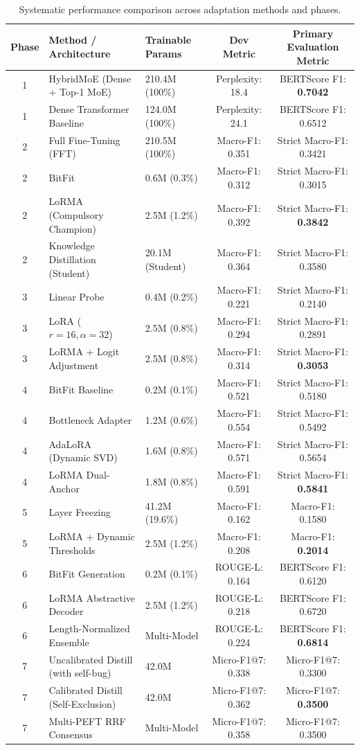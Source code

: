 \documentclass[11pt, oneside]{article}
\begin{document}
\begin{table}[H]
\centering
\small
\caption{Systematic performance comparison across adaptation methods and phases.}
\label{tab:variants}
\begin{tabular}{cllcc}
\toprule
\textbf{Phase} & \textbf{Method / Architecture} & \textbf{Trainable Params} & \textbf{Dev Metric} & \textbf{Primary Evaluation Metric} \\
\midrule
1 & HybridMoE (Dense + Top-1 MoE) & 210.4M (100\%) & Perplexity: 18.4 & BERTScore F1: \textbf{0.7042} \\
1 & Dense Transformer Baseline & 124.0M (100\%) & Perplexity: 24.1 & BERTScore F1: 0.6512 \\
\midrule
2 & Full Fine-Tuning (FFT) & 210.5M (100\%) & Macro-F1: 0.351 & Strict Macro-F1: 0.3421 \\
2 & BitFit & 0.6M (0.3\%) & Macro-F1: 0.312 & Strict Macro-F1: 0.3015 \\
2 & LoRMA (Compulsory Champion) & 2.5M (1.2\%) & Macro-F1: 0.392 & Strict Macro-F1: \textbf{0.3842} \\
2 & Knowledge Distillation (Student) & 20.1M (Student) & Macro-F1: 0.364 & Strict Macro-F1: 0.3580 \\
\midrule
3 & Linear Probe & 0.4M (0.2\%) & Macro-F1: 0.221 & Strict Macro-F1: 0.2140 \\
3 & LoRA ($r=16, \alpha=32$) & 2.5M (0.8\%) & Macro-F1: 0.294 & Strict Macro-F1: 0.2891 \\
3 & LoRMA + Logit Adjustment & 2.5M (0.8\%) & Macro-F1: 0.314 & Strict Macro-F1: \textbf{0.3053} \\
\midrule
4 & BitFit Baseline & 0.2M (0.1\%) & Macro-F1: 0.521 & Strict Macro-F1: 0.5180 \\
4 & Bottleneck Adapter & 1.2M (0.6\%) & Macro-F1: 0.554 & Strict Macro-F1: 0.5492 \\
4 & AdaLoRA (Dynamic SVD) & 1.6M (0.8\%) & Macro-F1: 0.571 & Strict Macro-F1: 0.5654 \\
4 & LoRMA Dual-Anchor & 1.8M (0.8\%) & Macro-F1: 0.591 & Strict Macro-F1: \textbf{0.5841} \\
\midrule
5 & Layer Freezing & 41.2M (19.6\%) & Macro-F1: 0.162 & Macro-F1: 0.1580 \\
5 & LoRMA + Dynamic Thresholds & 2.5M (1.2\%) & Macro-F1: 0.208 & Macro-F1: \textbf{0.2014} \\
\midrule
6 & BitFit Generation & 0.2M (0.1\%) & ROUGE-L: 0.164 & BERTScore F1: 0.6120 \\
6 & LoRMA Abstractive Decoder & 2.5M (1.2\%) & ROUGE-L: 0.218 & BERTScore F1: 0.6720 \\
6 & Length-Normalized Ensemble & Multi-Model & ROUGE-L: 0.224 & BERTScore F1: \textbf{0.6814} \\
\midrule
7 & Uncalibrated Distill (with self-bug) & 42.0M & Micro-F1@7: 0.338 & Micro-F1@7: 0.3300 \\
7 & Calibrated Distill (Self-Exclusion) & 42.0M & Micro-F1@7: 0.362 & Micro-F1@7: \textbf{0.3500} \\
7 & Multi-PEFT RRF Consensus & Multi-Model & Micro-F1@7: 0.358 & Micro-F1@7: 0.3500 \\
\bottomrule
\end{tabular}
\end{table}
\end{document}
